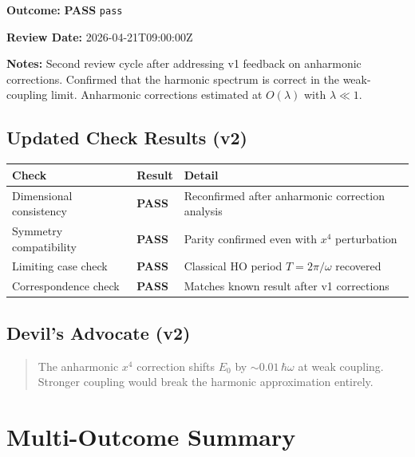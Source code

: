 \documentclass[11pt,a4paper]{article}
\newcommand{\statuspass}{\textcolor{passgreen}{\textbf{PASS}}}
\begin{document}
\begin{valbox}
\textbf{Outcome:} \statuspass{} \texttt{pass}

\textbf{Review Date:} 2026-04-21T09:00:00Z

\textbf{Notes:} Second review cycle after addressing v1 feedback on anharmonic
corrections. Confirmed that the harmonic spectrum is correct in the
weak-coupling limit. Anharmonic corrections estimated at $O(\lambda)$ with
$\lambda \ll 1$.
\end{valbox}

\subsection{Updated Check Results (v2)}

\begin{longtable}{>{\raggedright}p{4cm} p{2cm} p{6cm}}
\toprule
\textbf{Check} & \textbf{Result} & \textbf{Detail} \\
\midrule
\endhead
Dimensional consistency & \statuspass & Reconfirmed after anharmonic correction analysis \\
Symmetry compatibility & \statuspass & Parity confirmed even with $x^4$ perturbation \\
Limiting case check  & \statuspass & Classical HO period $T = 2\pi/\omega$ recovered \\
Correspondence check & \statuspass & Matches known result after v1 corrections \\
\bottomrule
\end{longtable}

\subsection{Devil's Advocate (v2)}

\begin{quote}
The anharmonic $x^4$ correction shifts $E_0$ by $\sim 0.01\,\hbar\omega$
at weak coupling. Stronger coupling would break the harmonic approximation
entirely.
\end{quote}


\section{Multi-Outcome Summary}
\end{document}
